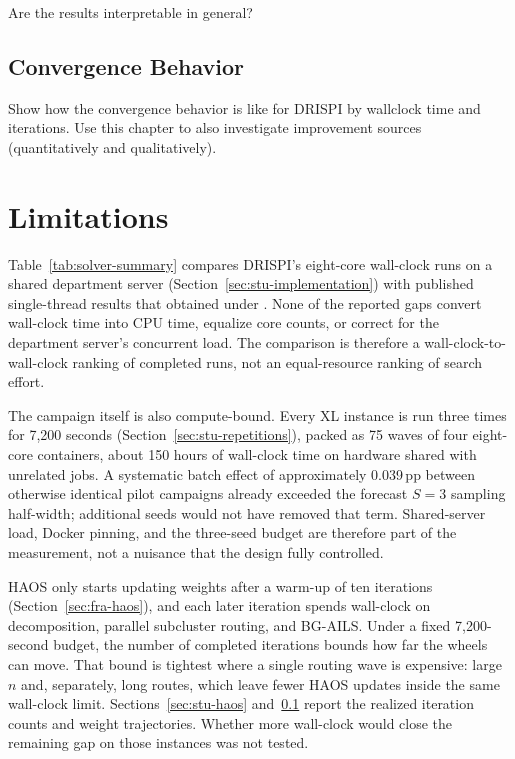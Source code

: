 Are the results interpretable in general?

\subsection{Convergence Behavior}\label{sec:stu-convergence}
Show how the convergence behavior is like for DRISPI by wallclock time and iterations. Use this chapter to also investigate improvement sources (quantitatively and qualitatively).

\section{Limitations}\label{sec:stu-limitations}

Table~\ref{tab:solver-summary} compares DRISPI's eight-core wall-clock runs on a shared department server (Section~\ref{sec:stu-implementation}) with published single-thread results that \citet{queirogaXLInstancesCapacitated2026} obtained under . None of the reported gaps convert wall-clock time into CPU time, equalize core counts, or correct for the department server's concurrent load. The comparison is therefore a wall-clock-to-wall-clock ranking of completed runs, not an equal-resource ranking of search effort.

The campaign itself is also compute-bound. Every XL instance is run three times for 7{,}200 seconds (Section~\ref{sec:stu-repetitions}), packed as 75 waves of four eight-core containers, about 150 hours of wall-clock time on hardware shared with unrelated jobs. A systematic batch effect of approximately 0.039\,pp between otherwise identical pilot campaigns already exceeded the forecast $S=3$ sampling half-width; additional seeds would not have removed that term. Shared-server load, Docker pinning, and the three-seed budget are therefore part of the measurement, not a nuisance that the design fully controlled.

HAOS only starts updating weights after a warm-up of ten iterations (Section~\ref{sec:fra-haos}), and each later iteration spends wall-clock on decomposition, parallel subcluster routing, and BG-AILS. Under a fixed 7{,}200-second budget, the number of completed iterations bounds how far the wheels can move. That bound is tightest where a single routing wave is expensive: large $n$ and, separately, long routes, which leave fewer HAOS updates inside the same wall-clock limit. Sections~\ref{sec:stu-haos} and~\ref{sec:stu-convergence} report the realized iteration counts and weight trajectories. Whether more wall-clock would close the remaining gap on those instances was not tested.


